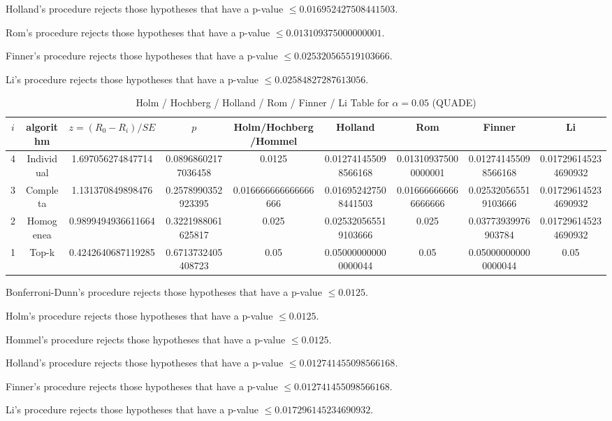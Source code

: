 \documentclass[a4paper,10pt]{article}
\begin{document}
\begin{landscape}
Holland's procedure rejects those hypotheses that have a p-value $\le0.016952427508441503$.


Rom's procedure rejects those hypotheses that have a p-value $\le0.013109375000000001$.


Finner's procedure rejects those hypotheses that have a p-value $\le0.025320565519103666$.


Li's procedure rejects those hypotheses that have a p-value $\le0.02584827287613056$.



\newpage

\begin{table}[!htp]
\centering\scriptsize
\caption{Holm / Hochberg / Holland / Rom / Finner / Li Table for $\alpha=0.05$ (QUADE)}
\begin{tabular}{ccccccccc}
$i$&algorithm&$z=(R_0 - R_i)/SE$&$p$&Holm/Hochberg/Hommel&Holland&Rom&Finner&Li\\
\hline
4&Individual&1.697056274847714&0.08968602177036458&0.0125&0.012741455098566168&0.013109375000000001&0.012741455098566168&0.017296145234690932\\
3&Completa&1.131370849898476&0.2578990352923395&0.016666666666666666&0.016952427508441503&0.016666666666666666&0.025320565519103666&0.017296145234690932\\
2&Homogenea&0.9899494936611664&0.3221988061625817&0.025&0.025320565519103666&0.025&0.03773939976903784&0.017296145234690932\\
1&Top-k&0.4242640687119285&0.6713732405408723&0.05&0.050000000000000044&0.05&0.050000000000000044&0.05\\
\hline
\end{tabular}
\end{table}
Bonferroni-Dunn's procedure rejects those hypotheses that have a p-value $\le0.0125$.


Holm's procedure rejects those hypotheses that have a p-value $\le0.0125$.


Hommel's procedure rejects those hypotheses that have a p-value $\le0.0125$.


Holland's procedure rejects those hypotheses that have a p-value $\le0.012741455098566168$.


Finner's procedure rejects those hypotheses that have a p-value $\le0.012741455098566168$.


Li's procedure rejects those hypotheses that have a p-value $\le0.017296145234690932$.



\newpage


\end{landscape}
\end{document}
